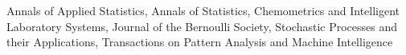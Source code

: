 \documentclass[overlapped,line,letterpaper]{res}
\begin{document}
\begin{resume}
Annals of Applied Statistics,
Annals of Statistics,
Chemometrics and Intelligent Laboratory Systems,
Journal of the Bernoulli Society,
Stochastic Processes and their Applications,
Transactions on Pattern Analysis and Machine Intelligence



%


%



\end{resume}
\end{document}
